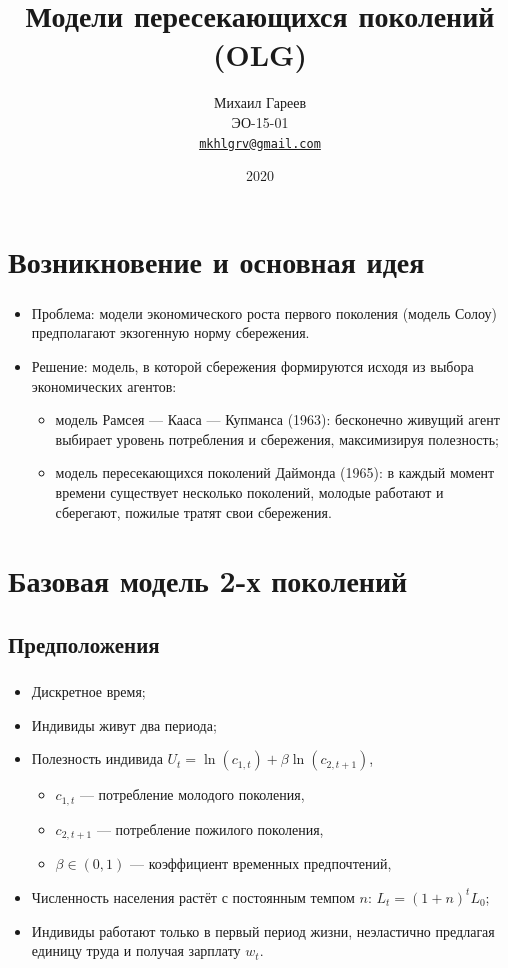 \documentclass[c, dvipsnames]{beamer}  %
\title[OLG-модели]{Модели пересекающихся поколений (OLG)}
\author[Михаил Гареев]{Михаил Гареев \\ \smallskip \scriptsize ЭО-15-01 \\ \smallskip \scriptsize \href{mailto:mkhlgrv@gmail.com}{\nolinkurl{mkhlgrv@gmail.com} }}
\institute[РАНХиГС]{ \uppercase{
 Российская Академия Народного Хозяйства и  \\ Государственной Службы при Президенте Российской Федерации}}
\date{2020}
\begin{document}
\frame[plain]{\titlepage}	%


\section{Возникновение и основная идея}

\begin{frame}
 \frametitle{\insertsection}
    \begin{itemize}
        \item Проблема: модели экономического роста первого поколения (модель Солоу) предполагают экзогенную норму сбережения.
        \item Решение: модель, в которой сбережения формируются исходя из выбора экономических агентов:
        \begin{itemize}
        \item модель Рамсея --- Кааса --- Купманса (1963): бесконечно живущий агент выбирает уровень потребления и сбережения, максимизируя полезность;
        \item модель пересекающихся поколений Даймонда (1965): в каждый момент времени существует несколько поколений, молодые работают и сберегают, пожилые тратят свои сбережения. 
        \end{itemize}
    \end{itemize}
\end{frame}

\section{Базовая модель 2-х поколений}
\subsection{Предположения}
\begin{frame}
 \frametitle{\insertsection}
 \framesubtitle{\insertsubsection}
     \begin{itemize}
        \item Дискретное время;
        \item Индивиды живут два периода;
        \item Полезность индивида $U_t = \ln(c_{1,t}) + \beta \ln(c_{2, t+1 })$,
        \begin{itemize}
            \item $c_{1,t}$ --- потребление молодого поколения,
        \item $c_{2,t + 1}$ --- потребление пожилого поколения,
        \item $\beta \in (0, 1)$ --- коэффициент временных предпочтений,
        \end{itemize}
        \item Численность населения растёт с постоянным темпом $n$: $L_t = (1+n)^t L_0$;
        \item Индивиды работают только в первый период жизни, неэластично предлагая единицу труда и получая зарплату $w_t$.
        
    \end{itemize}

\end{frame}
\end{document}
